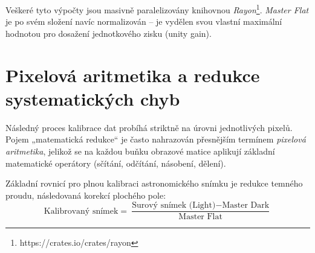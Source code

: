 Veškeré tyto výpočty jsou masivně paralelizovány knihovnou \textit{Rayon}\footnote{https://crates.io/crates/rayon}. \textit{Master Flat} je po svém složení navíc normalizován – je vydělen svou vlastní maximální hodnotou pro dosažení jednotkového zisku (unity gain).

\section{Pixelová aritmetika a redukce systematických chyb}
Následný proces kalibrace dat probíhá striktně na úrovni jednotlivých pixelů. Pojem „matematická redukce“ je často nahrazován přesnějším termínem \textit{pixelová aritmetika}, jelikož se na každou buňku obrazové matice aplikují základní matematické operátory (sčítání, odčítání, násobení, dělení). 

Základní rovnicí pro plnou kalibraci astronomického snímku je redukce temného proudu, následovaná korekcí plochého pole:\cite{berry2005}
\begin{equation}
    \text{Kalibrovaný snímek} = \frac{\text{Surový snímek (Light)} - \text{Master Dark}}{\text{Master Flat}}
\end{equation}

